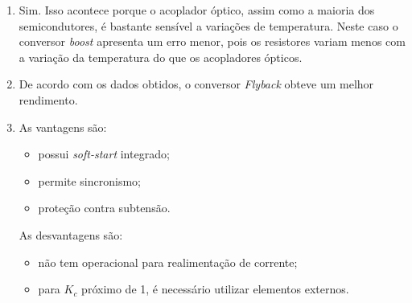 \begin{enumerate}
      \item Sim. Isso acontece porque o acoplador óptico, assim como a maioria dos semicondutores, é bastante sensível a variações de temperatura. Neste caso o conversor \textit{boost} apresenta um erro menor, pois os resistores variam menos com a variação da temperatura do que os acopladores ópticos.
      
      \item De acordo com os dados obtidos, o conversor \textit{Flyback} obteve um melhor rendimento.
      
      \item As vantagens são: 
      
      \begin{itemize}
        \item possui \textit{soft-start} integrado;
        \item permite sincronismo;
        \item proteção contra subtensão.
      \end{itemize}
      
      As desvantagens são: 
      
      \begin{itemize}
        \item não tem operacional para realimentação de corrente;
        \item para $K_c$ próximo de 1, é necessário utilizar elementos externos.
      \end{itemize}
  \end{enumerate}
          
